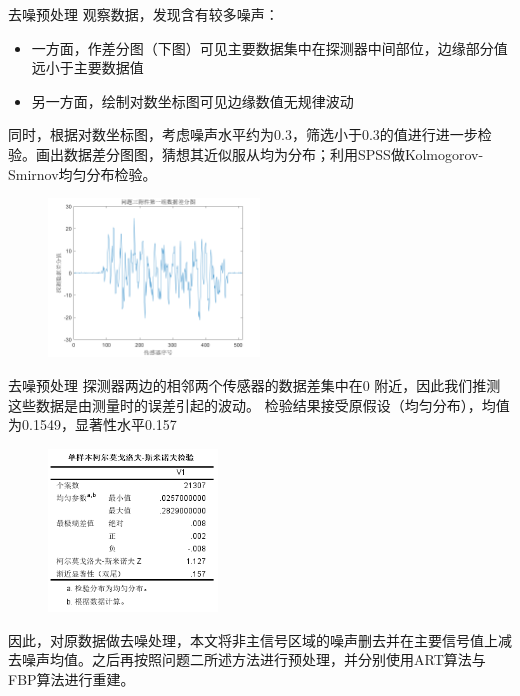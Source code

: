 \documentclass{beamer} %
\begin{document}
\begin{frame}{去噪预处理}
	\small 观察数据，发现含有较多噪声：
	\begin{itemize}
		\item \small 一方面，作差分图（下图）可见主要数据集中在探测器中间部位，边缘部分值远小于主要数据值 
		\item \small 另一方面，绘制对数坐标图可见边缘数值无规律波动  
	\end{itemize}
	同时，根据对数坐标图，考虑噪声水平约为0.3，筛选小于0.3的值进行进一步检验。画出数据差分图图，猜想其近似服从均为分布；利用SPSS做Kolmogorov-Smirnov均匀分布检验。
	\begin{figure}[H]
		\centering
		\includegraphics[width=0.5\textwidth]{./pic/fujian5_1.png}\\
	\end{figure}
\end{frame}
  
  
  
\begin{frame}{去噪预处理}
	\small 探测器两边的相邻两个传感器的数据差集中在0 附近，因此我们推测这些数据是由测量时的误差引起的波动。
	\small 检验结果接受原假设（均匀分布），均值为0.1549，显著性水平0.157\\
	\begin{figure}[H]
		\centering
		\includegraphics[width=0.4\textwidth]{./pic/K-S.jpg}\\
	\end{figure}
	\small 因此，对原数据做去噪处理，本文将非主信号区域的噪声删去并在主要信号值上减去噪声均值。之后再按照问题二所述方法进行预处理，并分别使用ART算法与FBP算法进行重建。
\end{frame}
  
\end{document}
